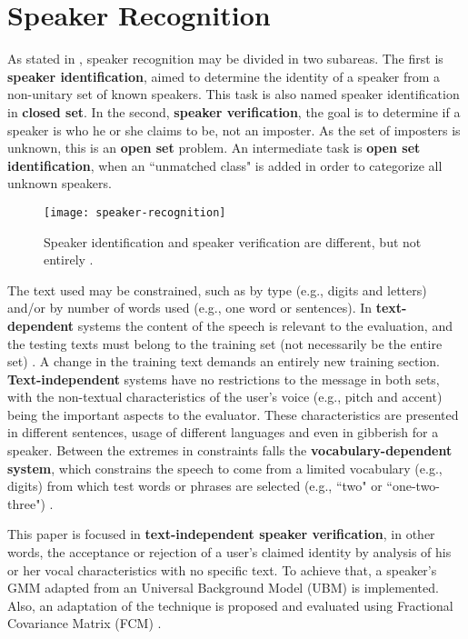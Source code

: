 \section{Speaker Recognition}
\label{sec:speaker-recognition}

As stated in \cite{reynolds.campbell.2008}, speaker recognition may be divided in two subareas. The first is \textbf{speaker identification}, aimed to determine the identity of a speaker from a non-unitary set of known speakers. This task is also named speaker identification in \textbf{closed set}. In the second, \textbf{speaker verification}, the goal is to determine if a speaker is who he or she claims to be, not an imposter. As the set of imposters is unknown, this is an \textbf{open set} problem. An intermediate task is \textbf{open set identification}, when an ``unmatched class" is added in order to categorize all unknown speakers.

\begin{figure}[ht]
    \centering
    \texttt{[image: speaker-recognition]}
    \caption{Speaker identification and speaker verification are different, but not entirely \cite{reynolds.1995a}.}
    \label{fig:speaker-recognition}
\end{figure}

The text used may be constrained, such as by type (e.g., digits and letters) and/or by number of words used (e.g., one word or sentences). In \textbf{text-dependent} systems the content of the speech is relevant to the evaluation, and the testing texts must belong to the training set (not necessarily be the entire set) \cite{hebert.2008}. A change in the training text demands an entirely new training section. \textbf{Text-independent} systems have no restrictions to the message in both sets, with the non-textual characteristics of the user's voice (e.g., pitch and accent) being the important aspects to the evaluator. These characteristics are presented in different sentences, usage of different languages and even in gibberish for a speaker. Between the extremes in constraints falls the \textbf{vocabulary-dependent system}, which constrains the speech to come from a limited vocabulary (e.g., digits) from which test words or phrases are selected (e.g., ``two" or ``one-two-three") \cite{reynolds.1995a}.

This paper is focused in \textbf{text-independent speaker verification}, in other words, the acceptance or rejection of a user's claimed identity by analysis of his or her vocal characteristics with no specific text. To achieve that, a speaker's GMM adapted from an Universal Background Model (UBM) \cite{reynolds.quatieri.dunn.2000} is implemented. Also, an adaptation of the technique is proposed and evaluated using Fractional Covariance Matrix (FCM) \cite{gao.zhou.pu.2013}.

